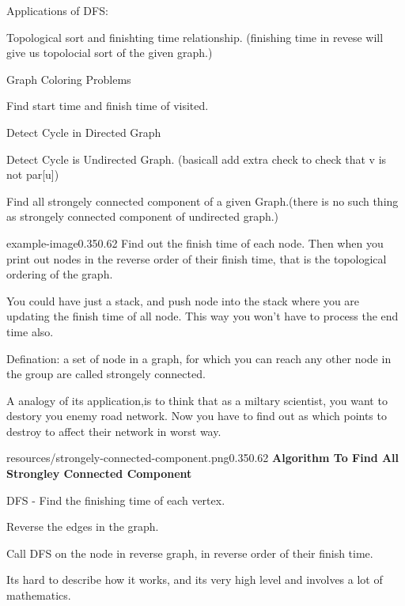 Applications of DFS:
\begin{compactenum}[(i)]
\item Topological sort and finishting time relationship. (finishing time in revese will give us topolocial sort of the given graph.)
\item Graph Coloring Problems
\item Find start time and finish time of visited.
\item Detect Cycle in Directed Graph
\item Detect Cycle is Undirected Graph. (basicall add extra check to check that v is not par[u])
\item Find all strongely connected component of a given Graph.(there is no such thing as strongely connected component of undirected graph.)
\end{compactenum}

\begin{lfigure}{example-image}{0.35}{0.62}
    Find out the finish time of each node. Then when you print out nodes in the reverse order of their finish time, that is the topological ordering of the graph.

    You could have just a stack, and push node into the stack where you are updating the finish time of all node. This way you won't have to process the end time also.
\end{lfigure}


Defination: a set of node in a graph, for which you can reach any other node in the group are called strongely connected.

A analogy of its application,is to think that as a miltary scientist, you want to destory you enemy road network. Now you have to find out as which points to destroy to affect their network in worst way.

\begin{lfigure}{resources/strongely-connected-component.png}{0.35}{0.62}
   \textbf{Algorithm To Find All Strongley Connected Component}
   \begin{compactenum}
    \item DFS - Find the finishing time of each vertex.
    \item Reverse the edges in the graph.
    \item Call DFS on the node in reverse graph, in reverse order of their finish time.
   \end{compactenum}

   Its hard to describe how it works, and its very high level and involves a lot of mathematics.
\end{lfigure}